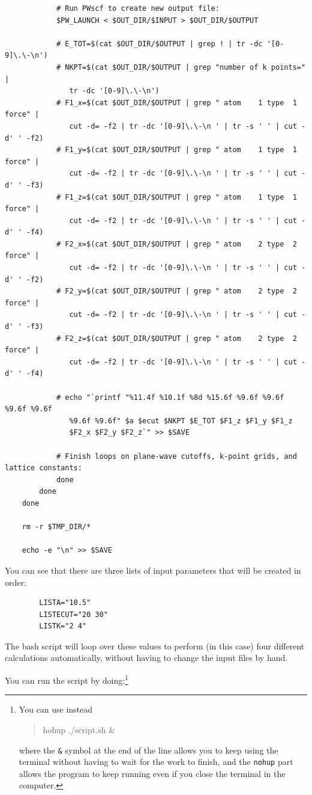 \documentclass[12pt]{article}
\newcommand{\code}[1]{
\begin{quotation}
  #1 
\end{quotation}
}
\begin{document}
\begin{verbatim}
            # Run PWscf to create new output file:
            $PW_LAUNCH < $OUT_DIR/$INPUT > $OUT_DIR/$OUTPUT

            # E_TOT=$(cat $OUT_DIR/$OUTPUT | grep ! | tr -dc '[0-9]\.\-\n')
            # NKPT=$(cat $OUT_DIR/$OUTPUT | grep "number of k points=" |
               tr -dc '[0-9]\.\-\n')
            # F1_x=$(cat $OUT_DIR/$OUTPUT | grep " atom    1 type  1   force" |
               cut -d= -f2 | tr -dc '[0-9]\.\-\n ' | tr -s ' ' | cut -d' ' -f2)
            # F1_y=$(cat $OUT_DIR/$OUTPUT | grep " atom    1 type  1   force" |
               cut -d= -f2 | tr -dc '[0-9]\.\-\n ' | tr -s ' ' | cut -d' ' -f3)
            # F1_z=$(cat $OUT_DIR/$OUTPUT | grep " atom    1 type  1   force" |
               cut -d= -f2 | tr -dc '[0-9]\.\-\n ' | tr -s ' ' | cut -d' ' -f4)
            # F2_x=$(cat $OUT_DIR/$OUTPUT | grep " atom    2 type  2   force" |
               cut -d= -f2 | tr -dc '[0-9]\.\-\n ' | tr -s ' ' | cut -d' ' -f2)
            # F2_y=$(cat $OUT_DIR/$OUTPUT | grep " atom    2 type  2   force" |
               cut -d= -f2 | tr -dc '[0-9]\.\-\n ' | tr -s ' ' | cut -d' ' -f3)
            # F2_z=$(cat $OUT_DIR/$OUTPUT | grep " atom    2 type  2   force" |
               cut -d= -f2 | tr -dc '[0-9]\.\-\n ' | tr -s ' ' | cut -d' ' -f4)

            # echo "`printf "%11.4f %10.1f %8d %15.6f %9.6f %9.6f %9.6f %9.6f
               %9.6f %9.6f" $a $ecut $NKPT $E_TOT $F1_z $F1_y $F1_z
               $F2_x $F2_y $F2_z`" >> $SAVE

            # Finish loops on plane-wave cutoffs, k-point grids, and lattice constants:
            done
        done
    done

    rm -r $TMP_DIR/*

    echo -e "\n" >> $SAVE

    \end{verbatim}
    
    You can see that there are three lists of input parameters that will be created in
    order:
    \begin{verbatim}
        LISTA="10.5"       
        LISTECUT="20 30"    
        LISTK="2 4"         
    \end{verbatim}
    The bash script will loop over these values to perform  (in this case) four
    different calculations automatically, without having to change the input files
    by hand.
    
    You can run the script by doing:\footnote{You can use instead \code{hohup ./script.sh $\&$} where the {\tt \&} symbol at the end of the line allows you to keep using the terminal without having to wait for the work to finish, and the {\tt nohup} part allows
    the program to keep running even if you close the terminal in the computer.}
\end{document}
